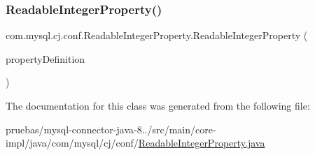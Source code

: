 \subsubsection{\texorpdfstring{Readable\+Integer\+Property()}{ReadableIntegerProperty()}}
{\footnotesize\ttfamily com.\+mysql.\+cj.\+conf.\+Readable\+Integer\+Property.\+Readable\+Integer\+Property (\begin{DoxyParamCaption}\item[{\mbox{\hyperlink{interfacecom_1_1mysql_1_1cj_1_1conf_1_1_property_definition}{Property\+Definition}}$<$ Integer $>$}]{property\+Definition }\end{DoxyParamCaption})}



The documentation for this class was generated from the following file\+:\begin{DoxyCompactItemize}
\item 
pruebas/mysql-\/connector-\/java-\/8../src/main/core-\/impl/java/com/mysql/cj/conf/\mbox{\hyperlink{_readable_integer_property_8java}{Readable\+Integer\+Property.\+java}}\end{DoxyCompactItemize}

